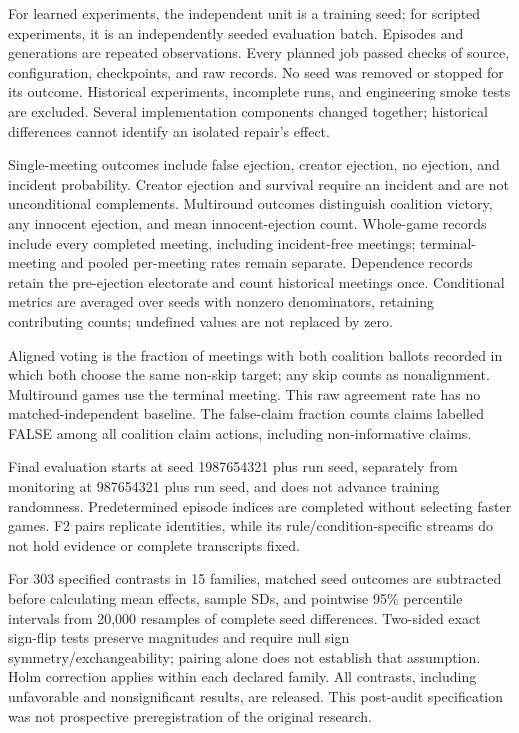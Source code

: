\documentclass[
  12pt,
]{article}
\begin{document}
For learned experiments, the independent unit is a training seed; for
scripted experiments, it is an independently seeded evaluation batch.
Episodes and generations are repeated observations. Every planned job
passed checks of source, configuration, checkpoints, and raw records. No
seed was removed or stopped for its outcome. Historical experiments,
incomplete runs, and engineering smoke tests are excluded. Several
implementation components changed together; historical differences
cannot identify an isolated repair's effect.

Single-meeting outcomes include false ejection, creator ejection, no
ejection, and incident probability. Creator ejection and survival
require an incident and are not unconditional complements. Multiround
outcomes distinguish coalition victory, any innocent ejection, and mean
innocent-ejection count. Whole-game records include every completed
meeting, including incident-free meetings; terminal-meeting and pooled
per-meeting rates remain separate. Dependence records retain the
pre-ejection electorate and count historical meetings once. Conditional
metrics are averaged over seeds with nonzero denominators, retaining
contributing counts; undefined values are not replaced by zero.

Aligned voting is the fraction of meetings with both coalition ballots
recorded in which both choose the same non-skip target; any skip counts
as nonalignment. Multiround games use the terminal meeting. This raw
agreement rate has no matched-independent baseline. The false-claim
fraction counts claims labelled FALSE among all coalition claim actions,
including non-informative claims.

Final evaluation starts at seed 1987654321 plus run seed, separately
from monitoring at 987654321 plus run seed, and does not advance
training randomness. Predetermined episode indices are completed without
selecting faster games. F2 pairs replicate identities, while its
rule/condition-specific streams do not hold evidence or complete
transcripts fixed.

For 303 specified contrasts in 15 families, matched seed outcomes are
subtracted before calculating mean effects, sample SDs, and pointwise
95\% percentile intervals from 20,000 resamples of complete seed
differences. Two-sided exact sign-flip tests preserve magnitudes and
require null sign symmetry/exchangeability; pairing alone does not
establish that assumption. Holm correction applies within each declared
family. All contrasts, including unfavorable and nonsignificant results,
are released. This post-audit specification was not prospective
preregistration of the original research.
\end{document}
